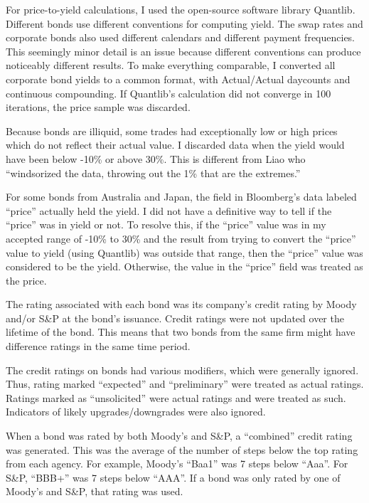 For price-to-yield calculations, I used the open-source software library Quantlib.\cite{QuantLib}  Different bonds use different conventions for computing yield.  The swap rates and corporate bonds also used different calendars and different payment frequencies.   This seemingly minor detail is an issue because different conventions can produce noticeably different results.\cite{Deng2012}   To make everything comparable, I converted all corporate bond yields to a common format, with Actual/Actual daycounts and continuous compounding.   If Quantlib's calculation did not converge in 100 iterations, the price sample was discarded.

Because bonds are illiquid, some trades had exceptionally low or high prices which do not reflect their actual value.  I discarded data when the yield would have been below -10\% or above 30\%.  This is different from Liao who ``windsorized the data, throwing out the 1\% that are the extremes.''\cite{Liao_email3}

For some bonds from Australia and Japan, the field in Bloomberg's data labeled ``price'' actually held the yield.  I did not have a definitive way to tell if the ``price'' was in yield or not.  To resolve this, if the ``price'' value was in my accepted range of -10\% to 30\% and the result from trying to convert the ``price'' value to yield (using Quantlib) was outside that range, then the ``price'' value was considered to be the yield.  Otherwise, the value in the ``price'' field was treated as the price.  
 
The rating associated with each bond was its company's credit rating by Moody and/or S\&P at the bond's issuance.  Credit ratings were not updated over the lifetime of the bond.  This means that two bonds from the same firm might have difference ratings in the same time period.  

The credit ratings on bonds had various modifiers, which were generally ignored.  Thus, rating marked ``expected'' and ``preliminary'' were treated as actual ratings.  Ratings marked as ``unsolicited'' were actual ratings and were treated as such.  Indicators of likely upgrades/downgrades were also ignored.  

When a bond was rated by both Moody's and S\&P, a ``combined'' credit rating was generated.  This was the average of the number of steps below the top rating from each agency.  For example,  Moody's ``Baa1'' was 7 steps below ``Aaa''.  For S\&P, ``BBB+'' was 7 steps below ``AAA''.  If a bond was only rated by one of Moody's and S\&P, that rating was used.  

